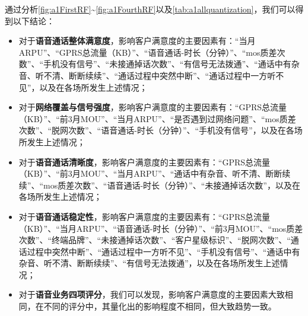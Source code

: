 \documentclass{MathorCupmodeling}
\begin{document}
	通过分析\textcolor{blue}{\cref{fig:a1FirstRF}}\textasciitilde\textcolor{blue}{\cref{fig:a1FourthRF}}以及\textcolor{blue}{\cref{tab:a1allquantization}}，我们可以得到以下结论：
	\begin{itemize}
		\item 对于\textbf{语音通话整体满意度}，影响客户满意度的主要因素有：“当月ARPU”、“GPRS总流量（KB）”、“语音通话-时长（分钟）”、“mos质差次数”、“手机没有信号”、“未接通掉话次数”、“有信号无法拨通”、“通话中有杂音、听不清、断断续续”、“通话过程中突然中断”、“通话过程中一方听不见”，以及在各场所发生上述情况；
		\item 对于\textbf{网络覆盖与信号强度}，影响客户满意度的主要因素有：“GPRS总流量（KB）”、“前3月MOU”、“当月ARPU”、“是否遇到过网络问题”、“mos质差次数”、“脱网次数”、“语音通话-时长（分钟）”、“手机没有信号”，以及在各场所发生上述情况；
		\item 对于\textbf{语音通话清晰度}，影响客户满意度的主要因素有：“GPRS总流量（KB）”、“前3月MOU”、“当月ARPU”、“通话中有杂音、听不清、断断续续”、“mos质差次数”、“语音通话-时长（分钟）”、“未接通掉话次数”，以及在各场所发生上述情况；
		\item 对于\textbf{语音通话稳定性}，影响客户满意度的主要因素有：“GPRS总流量（KB）”、“当月ARPU”、“语音通话-时长（分钟）”、“前3月MOU”、“mos质差次数”、“终端品牌”、“未接通掉话次数”、“客户星级标识”、“脱网次数”、“通话过程中突然中断”、“通话过程中一方听不见”、“手机没有信号”、“通话中有杂音、听不清、断断续续”、“有信号无法拨通”，以及在各场所发生上述情况；
		\item 对于\textbf{语音业务四项评分}，我们可以发现，影响客户满意度的主要因素大致相同，在不同的评分中，其量化出的影响程度不相同，但大致趋势一致。
	\end{itemize}
\end{document}
